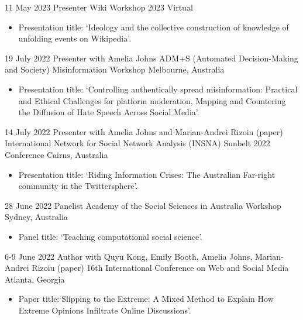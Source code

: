 \documentclass[11pt,a4paper,sans]{moderncv}
\begin{document}
\cventry 
{11 May 2023}
{Presenter}
{Wiki Workshop 2023}
{Virtual}
{}
      {
      \begin{itemize} %
        \item {Presentation title: `Ideology and the collective construction of knowledge of unfolding events on Wikipedia'.}
      \end{itemize}
    }
 
\cventry %
{19 July 2022}
{Presenter with Amelia Johns}
{ADM+S (Automated Decision-Making and Society) Misinformation Workshop}
{Melbourne, Australia}
{}
      {
      \begin{itemize} %
        \item {Presentation title: `Controlling authentically spread misinformation: Practical and Ethical
Challenges for platform moderation, Mapping and Countering the Diffusion of Hate Speech Across Social Media'.}
      \end{itemize}
    }

\cventry %
{14 July 2022}
{Presenter with Amelia Johns and Marian-Andrei Rizoiu (paper)}
{International Network for Social Network Analysis (INSNA) Sunbelt 2022 Conference}
{Cairns, Australia}
{}
       {
      \begin{itemize} %
        \item {Presentation title: `Riding Information Crises: The
            Australian Far-right community in the Twittersphere'.}
      \end{itemize}
    }

\cventry %
{28 June 2022}
{Panelist}
{Academy of the Social Sciences in Australia Workshop}
{Sydney, Australia}
{}
       {
      \begin{itemize} %
        \item {Panel title: `Teaching computational social science'.}
      \end{itemize}
    }

\cventry %
{6-9 June 2022}
{Author with Quyu Kong, Emily Booth, Amelia Johns, Marian-Andrei Rizoiu (paper)}
{16th International Conference on Web and Social Media}
{Atlanta, Georgia}
{}
       {
      \begin{itemize} %
        \item {Paper title:`Slipping to the {Extreme}: {A} {Mixed} {Method} to {Explain} {How} {Extreme} {Opinions} {Infiltrate} {Online} {Discussions}'.}
      \end{itemize}
    }
    
\end{document}
